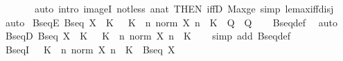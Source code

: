 \begin{isabellebody}
\ \ \ \ \ \ \ {\isacharparenleft}{\kern0pt}auto\ intro{\isacharbang}{\kern0pt}{\isacharcolon}{\kern0pt}\ imageI\ not{\isacharunderscore}{\kern0pt}less{\isacharbrackleft}{\kern0pt}\ {\isacharprime}{\kern0pt}a{\isacharequal}{\kern0pt}nat{\isacharcomma}{\kern0pt}\ THEN\ iffD{}{\isacharbrackright}{\kern0pt}\ Max{\isacharunderscore}{\kern0pt}ge\ simp{\isacharcolon}{\kern0pt}\ le{\isacharunderscore}{\kern0pt}max{\isacharunderscore}{\kern0pt}iff{\isacharunderscore}{\kern0pt}disj{\isacharparenright}{\kern0pt}\isanewline
{}\isamarkupfalse%
\ auto%
\endisatagproof
{\isafoldproof}%
%
\isadelimproof
\isanewline
%
\endisadelimproof
\isanewline
{}\isamarkupfalse%
\ BseqE{\isacharcolon}{\kern0pt}\ {\isachardoublequoteopen}Bseq\ X\ {\isasymLongrightarrow}\ {\isacharparenleft}{\kern0pt}{\isasymAnd}K{\isachardot}{\kern0pt}\ {}\ {\isacharless}{\kern0pt}\ K\ {\isasymLongrightarrow}\ {\isasymforall}n{\isachardot}{\kern0pt}\ norm\ {\isacharparenleft}{\kern0pt}X\ n{\isacharparenright}{\kern0pt}\ {\isasymle}\ K\ {\isasymLongrightarrow}\ Q{\isacharparenright}{\kern0pt}\ {\isasymLongrightarrow}\ Q{\isachardoublequoteclose}\isanewline
%
\isadelimproof
\ \ %
\endisadelimproof
%
\isatagproof
{}\isamarkupfalse%
\ Bseq{\isacharunderscore}{\kern0pt}def\ \isamarkupfalse%
\ auto%
\endisatagproof
{\isafoldproof}%
%
\isadelimproof
\isanewline
%
\endisadelimproof
\isanewline
{}\isamarkupfalse%
\ BseqD{\isacharcolon}{\kern0pt}\ {\isachardoublequoteopen}Bseq\ X\ {\isasymLongrightarrow}\ {\isasymexists}K{\isachardot}{\kern0pt}\ {}\ {\isacharless}{\kern0pt}\ K\ {\isasymand}\ {\isacharparenleft}{\kern0pt}{\isasymforall}n{\isachardot}{\kern0pt}\ norm\ {\isacharparenleft}{\kern0pt}X\ n{\isacharparenright}{\kern0pt}\ {\isasymle}\ K{\isacharparenright}{\kern0pt}{\isachardoublequoteclose}\isanewline
%
\isadelimproof
\ \ %
\endisadelimproof
%
\isatagproof
{}\isamarkupfalse%
\ {\isacharparenleft}{\kern0pt}simp\ add{\isacharcolon}{\kern0pt}\ Bseq{\isacharunderscore}{\kern0pt}def{\isacharparenright}{\kern0pt}%
\endisatagproof
{\isafoldproof}%
%
\isadelimproof
\isanewline
%
\endisadelimproof
\isanewline
{}\isamarkupfalse%
\ BseqI{\isacharcolon}{\kern0pt}\ {\isachardoublequoteopen}{}\ {\isacharless}{\kern0pt}\ K\ {\isasymLongrightarrow}\ {\isasymforall}n{\isachardot}{\kern0pt}\ norm\ {\isacharparenleft}{\kern0pt}X\ n{\isacharparenright}{\kern0pt}\ {\isasymle}\ K\ {\isasymLongrightarrow}\ Bseq\ X{\isachardoublequoteclose}\isanewline
%

\end{isabellebody}
